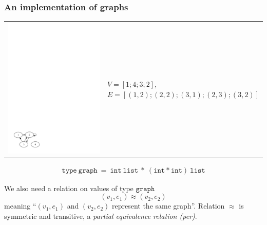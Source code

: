 \documentclass[compress,t]{beamer}
\newcommand{\per}{\approx}
\begin{document}
\begin{frame}
  \frametitle{An implementation of graphs}
  
  \begin{tabular}{cl}
   \includegraphics[width=0.4\textheight]{digraph}
   &
   \parbox{0.5\textwidth}{
     \footnotesize
      $V = [1; 4; 3; 2]$,\\
      $E = [(1,2); (2,2); (3,1); (2,3); (3,2)]$
    }
  \end{tabular}

  \pause

  \begin{gather*}
    \mathtt{type\ graph\ =\ int\ list\ *\ (int * int)\ list}
  \end{gather*}

  \pause

  We also need a relation on values of type $\mathtt{graph}$
  \begin{equation*}
    (v_1,e_1) \per (v_2,e_2)
  \end{equation*}
  meaning ``$(v_1, e_1)$ and $(v_2, e_2)$ represent the same graph''.
  Relation $\per$ is symmetric and transitive, a \emph{partial
    equivalence relation (per)}.
\end{frame}
\end{document}
